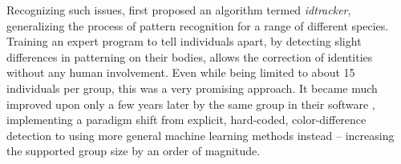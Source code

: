 \documentclass[9pt,lineno]{elife}
\newcommand{\figref}[1]{\textit{\textbf{\ref{#1}}}}
\newcommand{\idtracker}{\protect\path{ idtracker.ai}}
\begin{document}
Recognizing such issues, \citep{idtracker} first proposed an algorithm termed \textit{idtracker}, generalizing the process of pattern recognition for a range of different species. Training an expert program to tell individuals apart, by detecting slight differences in patterning on their bodies, allows the correction of identities without any human involvement. Even while being limited to about 15 individuals per group, this was a very promising approach. It became much improved upon only a few years later by the same group in their software \idtracker{} \citep{idtrackerai}, implementing a paradigm shift from explicit, hard-coded, color-difference detection to using more general machine learning methods instead -- increasing the supported group size by an order of magnitude.


\end{document}
